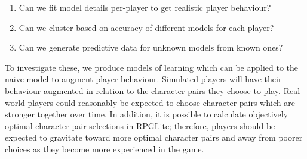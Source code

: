 \begin{enumerate}
  \item Can we fit model details per-player to get realistic player behaviour?
  \item Can we cluster based on accuracy of different models for each player?
  \item Can we generate predictive data for unknown models from known ones?
\end{enumerate}

To investigate these, we produce models of learning which can be applied to the
naive model to augment player behaviour. Simulated players will have their
behaviour augmented in relation to the character pairs they choose to play.
Real-world players could reasonably be expected to choose character pairs which
are stronger together over time. In addition, it is possible to calculate
objectively optimal character pair selections in RPGLite;
therefore, players should be expected to gravitate toward more optimal character
pairs and away from poorer choices as they become more experienced in the game.

